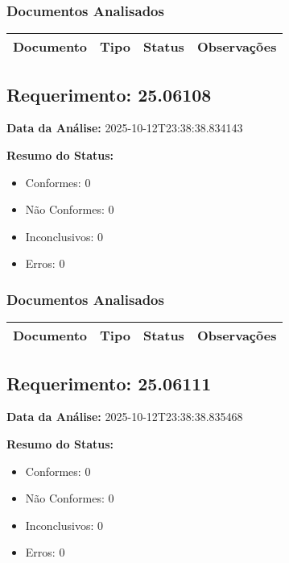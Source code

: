 \documentclass[12pt,a4paper]{article}
\begin{document}
\subsubsection{Documentos Analisados}

\begin{longtable}{|p{4cm}|p{2cm}|p{2cm}|p{6cm}|}
\hline
\textbf{Documento} & \textbf{Tipo} & \textbf{Status} & \textbf{Observações} \\
\hline
\endhead
\end{longtable}


\subsection{Requerimento: 25.06108}

\textbf{Data da Análise:} 2025-10-12T23:38:38.834143

\textbf{Resumo do Status:}
\begin{itemize}
    \item Conformes: 0
    \item Não Conformes: 0
    \item Inconclusivos: 0
    \item Erros: 0
\end{itemize}

\subsubsection{Documentos Analisados}

\begin{longtable}{|p{4cm}|p{2cm}|p{2cm}|p{6cm}|}
\hline
\textbf{Documento} & \textbf{Tipo} & \textbf{Status} & \textbf{Observações} \\
\hline
\endhead
\end{longtable}


\subsection{Requerimento: 25.06111}

\textbf{Data da Análise:} 2025-10-12T23:38:38.835468

\textbf{Resumo do Status:}
\begin{itemize}
    \item Conformes: 0
    \item Não Conformes: 0
    \item Inconclusivos: 0
    \item Erros: 0
\end{itemize}
\end{document}
